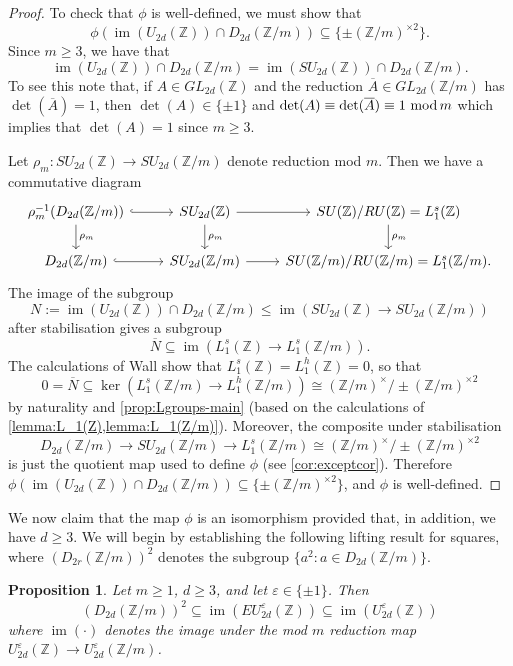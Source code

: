 \documentclass[11pt,a4paper,leqno]{amsart}
\newtheorem{proposition}[theorem]{Proposition}
\theoremstyle{definition}
\theoremstyle{remark}
\newcommand{\cy}[1]{\Z/{#1}}
\newcommand{\Z}{\mathbb{Z}}
\newcommand{\ol}{\overline}
\renewcommand{\mod}{\,\,\text{\normalfont mod}\,}
\DeclareMathOperator{\IM}{im}
\newcommand{\bZ}{\mathbb Z}
\newcommand{\U}{U^{\varepsilon}}
\newcommand{\EU}{EU^{\varepsilon}}
\begin{document}
\begin{proof} 
To check that $\phi$ is well-defined, we must show that 
\[ \phi(\IM{(U_{2d}(\Z))} \cap D_{2d}(\Z/m)) \subseteq  \{\pm (\cy m)^{\times 2}\}. \]
Since $m \ge 3$, we have that
\[ \IM{(U_{2d}(\Z))} \cap D_{2d}(\Z/m) = \IM{(SU_{2d}(\Z))} \cap D_{2d}(\Z/m). \]
To see this note that, if $A \in GL_{2d}(\Z)$ and the reduction $\ol{A} \in GL_{2d}(\Z/m)$ has $\det(\ol{A}) = 1$, then $\det(A) \in \{\pm 1\}$ and $\det(A) \equiv \det(\ol{A}) \equiv 1 \mod m$ which implies that $\det(A)=1$ since $m \ge 3$.

Let $\rho_m\colon  SU_{2d}(\Z) \to SU_{2d}(\Z/m)$ denote reduction mod $m$.
Then we have a commutative diagram
\[
\begin{tikzcd}
\rho_m^{-1}(D_{2d}(\Z/m)) \ar[r,hookrightarrow] \ar[d,"\rho_m"] & SU_{2d}(\Z) \ar[d,"\rho_m"] \ar[r] & SU(\bZ)/ RU(\bZ)  = L_1^s(\bZ) \ar[d,"\rho_m"] \\
	D_{2d}(\Z/m) \ar[r,hookrightarrow] & SU_{2d}(\Z/m) \ar[r] & SU(\cy m)/RU(\cy m) =L_1^s(\cy m).
\end{tikzcd}
\]
The image of the subgroup 
$$N:= \IM(U_{2d}(\Z)) \cap D_{2d}(\Z/m) \le \IM(SU_{2d}(\Z) \to SU_{2d}(\cy m))$$ after stabilisation gives a subgroup 
$$\overline{N} \subseteq \IM(L_{1}^s(\bZ) \to L_{1}^s(\cy m)).$$
The calculations of Wall \cite[\S 1]{Wall:1976} show that $L^s_1(\bZ) = L^h_1(\bZ) = 0$, so that
$$0 = \overline{N} \subseteq \ker(L_{1}^s(\cy m) \to L_{1}^h(\cy m)) \cong
  (\Z/m)^\times/\pm (\cy m)^{\times 2}$$
by naturality and \cref{prop:Lgroups-main}  (based on the calculations of \cref{lemma:L_1(Z),lemma:L_1(Z/m)}).
Moreover,  the composite under stabilisation 
$$D_{2d}(\cy m) \to SU_{2d}(\cy m) \to L_1^s(\cy m) \cong 
(\Z/m)^\times/\pm (\cy m)^{\times 2}$$
is just the quotient map used to define $\phi$ (see \cref{cor:exceptcor}).
Therefore  $\phi(\IM(U_{2d}(\Z)) \cap D_{2d}(\Z/m))\subseteq \{\pm (\Z/m)^{\times 2}\}$, and $\phi$ is well-defined.
\end{proof}

We now claim that the map $\phi$ is an isomorphism provided that, in addition, we have $d \ge 3$.
We will begin by establishing the following lifting result for squares, where $(D_{2r}(\Z/m))^2$ denotes the subgroup $\{a^2 : a \in D_{2d}(\Z/m)\}$.

\begin{proposition}
\label{lemma:lifting-squares}
Let $m \ge 1$, $d \ge 3$,  and let $\varepsilon \in \{\pm 1\}$.
Then 
\[(D_{2d}(\Z/m))^2 \subseteq \IM(\EU_{2d}(\Z)) \subseteq \IM(\U_{2d}(\Z))  \] 
where $\IM(\cdot)$ denotes the image under the mod $m$ reduction  map $\U_{2d}(\Z) \to \U_{2d}(\Z/m)$. 
\end{proposition}
\end{document}
